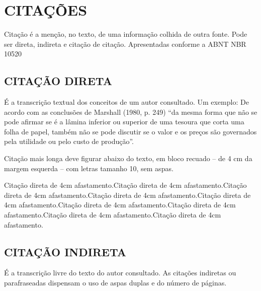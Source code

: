 %
%

\chapter{CITAÇÕES}

Citação é a menção, no texto, de uma informação colhida de outra fonte. Pode ser direta, indireta e citação de citação. Apresentadas conforme a ABNT NBR 10520

\section{CITAÇÃO DIRETA}

É a transcrição textual dos conceitos de um autor consultado. Um
exemplo: De acordo com as conclusões de Marshall (1980, p. 249) “da mesma forma que não se pode afirmar se é a lâmina inferior ou superior de uma tesoura que corta uma folha de papel, também não se pode discutir se o valor e os preços são governados pela utilidade ou pelo custo de produção”. 

Citação mais longa deve figurar abaixo do texto, em bloco recuado
– de 4 cm da margem esquerda – com letras tamanho 10, sem aspas.

\vspace*{0.35 cm}%
		    \large%
    		\hfill%
	    	\begin{minipage}{12 cm}%
	    		\begin{small} %
	    		\setlength{\baselineskip}{0.7\baselineskip}
				
		    	{Citação direta de 4cm afastamento.Citação direta de 4cm afastamento.Citação direta de 4cm afastamento.Citação direta de 4cm afastamento.Citação direta de 4cm afastamento.Citação direta de 4cm afastamento.Citação direta de 4cm afastamento.Citação direta de 4cm afastamento.Citação direta de 4cm afastamento.}
		    	
				\end{small} %
		    \end{minipage}%

\section{CITAÇÃO INDIRETA}

É a transcrição livre do texto do autor consultado. As citações
indiretas ou parafraseadas dispensam o uso de aspas duplas e do número de páginas.

